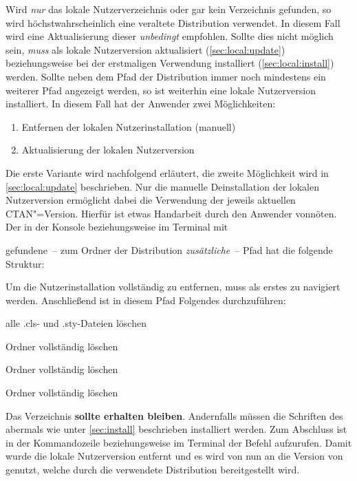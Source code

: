 Wird \emph{nur} das lokale Nutzerverzeichnis oder gar kein Verzeichnis 
gefunden, so wird höchstwahrscheinlich eine veraltete Distribution 
verwendet. In diesem Fall wird eine Aktualisierung dieser \emph{unbedingt} 
empfohlen. Sollte dies nicht möglich sein, \emph{muss} \TUDScript als lokale 
Nutzerversion aktualisiert (\autoref{sec:local:update}) beziehungsweise bei der 
erstmaligen Verwendung installiert (\autoref{sec:local:install}) werden. Sollte 
neben dem Pfad der Distribution immer noch mindestens ein weiterer Pfad 
angezeigt werden, so ist weiterhin eine lokale Nutzerversion installiert. In 
diesem Fall hat der Anwender zwei Möglichkeiten:
%
\begin{enumerate}
\item Entfernen der lokalen Nutzerinstallation (manuell)
\item Aktualisierung der lokalen Nutzerversion
\end{enumerate}
%
Die erste Variante wird nachfolgend erläutert, die zweite Möglichkeit wird in 
\autoref{sec:local:update} beschrieben. Nur die manuelle Deinstallation der 
lokalen Nutzerversion \TUDScript ermöglicht dabei die Verwendung der jeweils 
aktuellen CTAN"=Version. Hierfür ist etwas Handarbeit durch den Anwender 
vonnöten. Der in der Konsole beziehungsweise im Terminal mit
%
\begin{quoting}
\end{quoting}
%
gefundene~-- zum Ordner der Distribution \emph{zusätzliche}~-- Pfad hat die 
folgende Struktur:
%
\begin{quoting}
\end{quoting}
%
Um die Nutzerinstallation vollständig zu entfernen, muss als erstes zu 
 navigiert werden. Anschließend ist in diesem 
Pfad Folgendes durchzuführen:
%
\settowidth{}%
\begin{description}[labelwidth=\tempdim,labelsep=1em]
\item[\Path{tex/latex/tudscr/}]alle .cls- und .sty-Dateien löschen
\item[\Path{tex/latex/tudscr/}]Ordner  vollständig löschen
\item[\Path{doc/latex/}] Ordner  vollständig löschen
\item[\Path{source/latex/}] Ordner  vollständig löschen
\end{description}
%
Das Verzeichnis  
\textbf{sollte erhalten bleiben}. Andernfalls müssen die Schriften des \CDs 
abermals wie unter \autoref{sec:install} beschrieben installiert werden.
Zum Abschluss ist in der Kommandozeile beziehungsweise im Terminal der Befehl 
 aufzurufen. Damit wurde die lokale Nutzerversion entfernt und es 
wird von nun an die Version von \TUDScript genutzt, welche durch die verwendete 
Distribution bereitgestellt wird.



